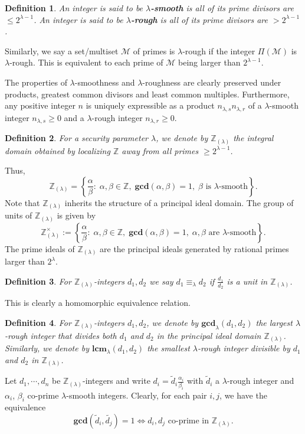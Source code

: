 \documentclass[11pt, lettersize, notitlepage, leqno, footskip=0.6cm]{article}
\newcommand{\bz}{\mathbb Z}
\newcommand{\LRA}{\Longleftrightarrow}
\newcommand{\eqlam}{\equiv_{\lam}}
\newcommand{\wti}{\widetilde}
\newcommand{\mc}{\mathcal}
\newcommand{\mbf}{\mathbf}
\newcommand{\al}{\alpha}
\newcommand{\be}{\beta}
\newcommand{\lam}{\lambda}
\newcommand{\lamb}{\lambda}
\newcommand{\bzlam}{\bz_{(\lam)}}
\newcommand{\mcM}{\mc{M}}
\newcommand{\vs}{\vspace{-0.15cm}}
\newcommand{\noin}{\noindent}
\newcommand{\LCM}{\mbf{lcm}}
\newcommand{\GCD}{\mbf{gcd}}
\newtheorem{Def}{Definition}[section]
\numberwithin{equation}{section}
\begin{document}
\begin{Def} An integer is said to be \textbf{$\lamb$-smooth} is all of its prime divisors are $\leq 2^{\lamb-1}$. An integer is said to be \textbf{$\lamb$-rough} is all of its prime divisors are $> 2^{\lam-1}$.\end{Def}

Similarly, we say a set/multiset $\mcM$ of primes is $\lam$-rough if the integer $\Pi(\mcM)$ is $\lam$-rough. This is equivalent to each prime of $\mcM$ being larger than $2^{\lam-1}$.

The properties of $\lamb$-smoothness and $\lamb$-roughness are clearly preserved under products, greatest common divisors and least common multiples. Furthermore, any positive integer $n$ is uniquely expressible as a product $n_{{\lam,s}}n_{{\lam,r}}$ of a $\lam$-smooth integer $n_{{\lam,s}}\geq 0$ and a $\lam$-rough integer $n_{{\lam,r}}\geq 0$.

\begin{Def} For a security parameter $\lamb$, we denote by $\bz_{(\lamb)}$ the integral domain obtained by localizing $\bz$ away from all primes $\geq 2^{\lamb-1}$. \end{Def}

\noindent Thus, \vs $$\bz_{(\lamb)} = \left\{\frac{\al}{\be}:\; \al,\be\in\bz,\;\GCD(\al,\be) = 1,\; \be \text{ is } \lamb\text{-smooth}\right\}.$$ Note that $\bz_{(\lamb)}$ inherits the structure of a principal ideal domain. The group of units of $\bzlam$ is given by $$\bzlam^{\times} := \left\{\frac{\al}{\be}:\; \al,\be\in\bz,\;\GCD(\al,\be) = 1,\; \al, \be \text{ are } \lamb\text{-smooth}\right\}. $$ The prime ideals of $\bz_{(\lamb)}$ are the principal ideals generated by rational primes larger than $2^{\lamb}$.

\begin{Def} For $\bzlam$-integers $d_1,d_2$ we say $d_1\eqlam d_2$ if $\frac{d_1}{d_2}$ is a unit in $\bzlam$.\end{Def}

\noin This is clearly a homomorphic equivalence relation.

\begin{Def} For $\bzlam$-integers $d_1,d_2$, we denote by $\GCD_{\lam}(d_1,d_2)$ the largest $\lam$-rough integer that divides both $d_1$ and $d_2$ in the principal ideal domain $\bzlam$. Similarly, we denote by $\LCM_{\lam}(d_1,d_2)$ the smallest $\lam$-rough integer divisible by $d_1$ and $d_2$ in $\bzlam$.\end{Def}

\noin Let $d_1,\cdots,d_n$ be $\bzlam$-integers and write $d_i = \wti{d}_i\frac{\al_i}{\be_i}$ with $\wti{d}_i$ a $\lam$-rough integer and $\al_i$, $\be_i$ co-prime $\lam$-smooth integers. Clearly, for each pair $i,j$, we have the equivalence \vs $$\GCD(\wti{d}_i,\wti{d_j}) = 1\LRA d_i,d_j\text{ co-prime in }\bzlam. $$
\end{document}
